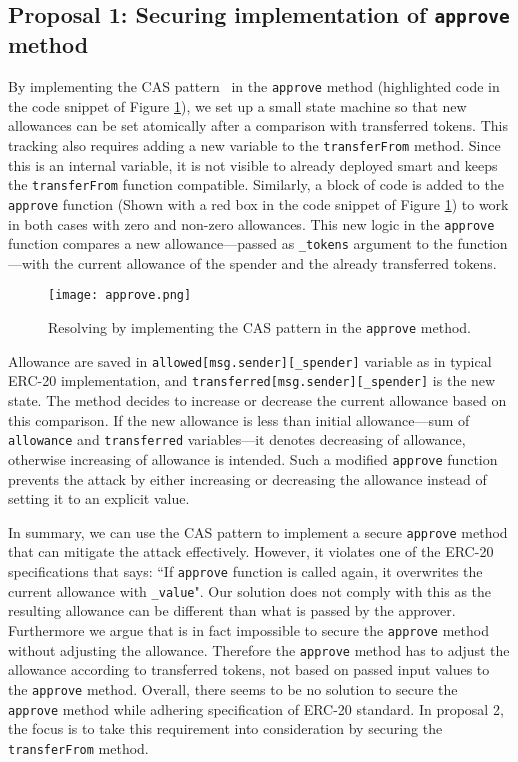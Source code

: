 \subsection{Proposal 1: Securing implementation of \texttt{approve} method}\label{subsec:prop1}
By implementing the CAS pattern~\cite{CompareSwap} in the \texttt{approve} method (highlighted code in the code snippet of Figure \ref{fig:approve}), we set up a small state machine so that new allowances can be set atomically after a comparison with transferred tokens. This tracking also requires adding a new variable to the \texttt{transferFrom} method. Since this is an internal variable, it is not visible to already deployed smart and keeps the \texttt{transferFrom} function compatible. Similarly, a block of code is added to the \texttt{approve} function (Shown with a red box in the code snippet of Figure \ref{fig:approve}) to work in both cases with zero and non-zero allowances. This new logic in the \texttt{approve} function compares a new allowance---passed as \texttt{\_tokens} argument to the function---with the current allowance of the spender and the already transferred tokens.

\begin{figure}[t]
	\centering
	\texttt{[image: approve.png]}
	\caption[Resolving \mwa in \texttt{approve}]{Resolving \mwa by implementing the CAS pattern in the \texttt{approve} method.}
	\label{fig:approve}
\end{figure}

Allowance are saved in \texttt{allowed[msg.sender][\_spender]} variable as in typical ERC-20 implementation, and \texttt{transferred[msg.sender][\_spender]} is the new state. The method decides to increase or decrease the current allowance based on this comparison. If the new allowance is less than initial allowance---sum of \texttt{allowance} and \texttt{transferred} variables---it denotes decreasing of allowance, otherwise increasing of allowance is intended. Such a modified \texttt{approve} function prevents the attack by either increasing or decreasing the allowance instead of setting it to an explicit value. 

In summary, we can use the CAS pattern to implement a secure \texttt{approve} method that can mitigate the attack effectively. However, it violates one of the ERC-20 specifications that says: ``If \texttt{approve} function is called again, it overwrites the current allowance with \texttt{\_value}". Our solution does not comply with this as the resulting allowance can be different than what is passed by the approver. Furthermore we argue that is in fact impossible to secure the \texttt{approve} method without adjusting the allowance. Therefore the \texttt{approve} method has to adjust the allowance according to transferred tokens, not based on passed input values to the \texttt{approve} method. Overall, there seems to be no solution to secure the \texttt{approve} method while adhering specification of ERC-20 standard. In proposal 2, the focus is to take this requirement into consideration by securing the \texttt{transferFrom} method.

